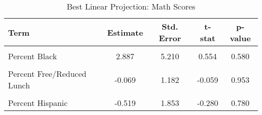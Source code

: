 \begin{table}[H]%
\centering
\caption{\label{tab:blp_math}Best Linear Projection: Math Scores}
\centering
\begin{tabular}[t]{lcccc}
\toprule
Term & Estimate & Std. Error & t-stat & p-value\\
\midrule
\cellcolor{gray!10}{(Intercept)} & \cellcolor{gray!10}{-0.05} & \cellcolor{gray!10}{0.032} & \cellcolor{gray!10}{-1.534} & \cellcolor{gray!10}{0.125}\\
Percent Black & 2.887 & 5.210 & 0.554 & 0.580\\
\cellcolor{gray!10}{Number of Magnet Schools} & \cellcolor{gray!10}{0.041} & \cellcolor{gray!10}{0.043} & \cellcolor{gray!10}{0.942} & \cellcolor{gray!10}{0.346}\\
Percent Free/Reduced Lunch & -0.069 & 1.182 & -0.059 & 0.953\\
\cellcolor{gray!10}{Log of Enrollment} & \cellcolor{gray!10}{0.756*} & \cellcolor{gray!10}{0.430} & \cellcolor{gray!10}{1.757} & \cellcolor{gray!10}{0.079}\\
Percent Hispanic & -0.519 & 1.853 & -0.280 & 0.780\\
\bottomrule
\end{tabular}
\end{table}
